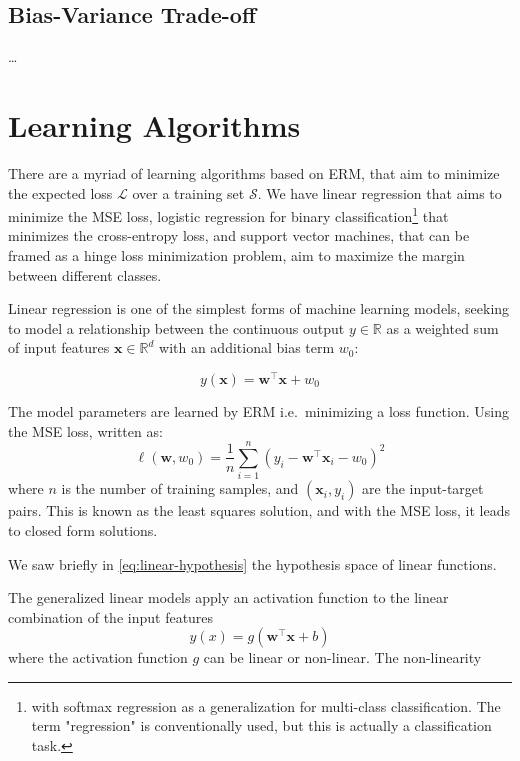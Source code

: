 \subsection{Bias-Variance Trade-off}

\dots

\section{Learning Algorithms}
There are a myriad of learning algorithms based on \gls{ERM}, that aim to minimize the expected loss $\mathcal{L}$ over a training set $\mathcal{S}$.  We have linear regression that aims to minimize the \gls{MSE} loss, logistic regression for binary classification\footnote{with softmax regression as a generalization for multi-class classification. The term "regression" is conventionally used, but this is actually a classification task.} that minimizes the cross-entropy loss, and support vector machines, that can be framed as a hinge loss minimization problem, aim to maximize the margin between different classes.


Linear regression is one of the simplest forms of machine learning models, seeking to model a relationship between the continuous output $y \in \mathbb{R}$ as a weighted sum of input features $\mathbf{x} \in \mathbb{R}^d$ with an additional bias term $w_0$:

\begin{equation}\label{eq:linear-regression}
    y(\mathbf{x}) = \mathbf{w}^\top \mathbf{x} + w_0
\end{equation}

The model parameters are learned by \gls{ERM} i.e.\ minimizing a loss function. Using the \gls{MSE} loss, written as:
\begin{equation}\label{eq:mse-loss}
    \ell(\mathbf{w}, w_0) = \frac{1}{n} \sum_{i=1}^{n} (y_i - \mathbf{w}^\top \mathbf{x}_i - w_0)^2
\end{equation}
where $n$ is the number of training samples, and $(\mathbf{x}_i, y_i)$ are the input-target pairs. This is known as the least squares solution, and with the MSE loss, it leads to closed form solutions.

We saw briefly in \cref{eq:linear-hypothesis} the hypothesis space of linear functions. 

The generalized linear models apply an activation function to the linear combination of the input features
\begin{equation}
    y(x) = g(\mathbf{w}^\top \mathbf{x} + b)
\end{equation}
where the activation function $g$ can be linear or non-linear. The non-linearity 

